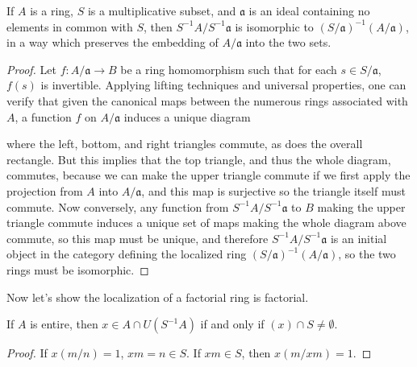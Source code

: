 \begin{prop}
    If $A$ is a ring, $S$ is a multiplicative subset, and $\mathfrak{a}$ is an ideal containing no elements in common with $S$, then $S^{-1}A/S^{-1}\mathfrak{a}$ is isomorphic to $(S/\mathfrak{a})^{-1}(A/\mathfrak{a})$, in a way which preserves the embedding of $A/\mathfrak{a}$ into the two sets.
\end{prop}
\begin{proof}
    Let $f: A/\mathfrak{a} \to B$ be a ring homomorphism such that for each $s \in S/\mathfrak{a}$, $f(s)$ is invertible. Applying lifting techniques and universal properties, one can verify that given the canonical maps between the numerous rings associated with $A$, a function $f$ on $A/\mathfrak{a}$ induces a unique diagram
    \begin{center}
    \end{center}
    where the left, bottom, and right triangles commute, as does the overall rectangle. But this implies that the top triangle, and thus the whole diagram, commutes, because we can make the upper triangle commute if we first apply the projection from $A$ into $A/\mathfrak{a}$, and this map is surjective so the triangle itself must commute. Now conversely, any function from $S^{-1}A/S^{-1}\mathfrak{a}$ to $B$ making the upper triangle commute induces a unique set of maps making the whole diagram above commute, so this map must be unique, and therefore $S^{-1}A/S^{-1}\mathfrak{a}$ is an initial object in the category defining the localized ring $(S/\mathfrak{a})^{-1}(A/\mathfrak{a})$, so the two rings must be isomorphic.
\end{proof}

Now let's show the localization of a factorial ring is factorial.

\begin{lemma}
    If $A$ is entire, then $x \in A \cap U(S^{-1}A)$ if and only if $(x) \cap S \neq \emptyset$.
\end{lemma}
\begin{proof}
    If $x (m/n) = 1$, $xm = n \in S$. If $xm \in S$, then $x (m/xm) = 1$.
\end{proof}

